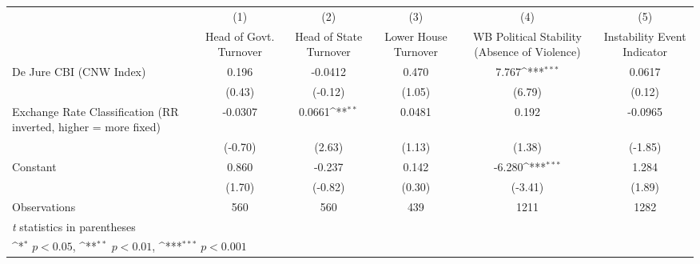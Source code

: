 {
\def\sym#1{\ifmmode^{#1}\else\(^{#1}\)\fi}
\begin{tabular}{l*{5}{c}}
\hline\hline
                &\multicolumn{1}{c}{(1)}&\multicolumn{1}{c}{(2)}&\multicolumn{1}{c}{(3)}&\multicolumn{1}{c}{(4)}&\multicolumn{1}{c}{(5)}\\
                &\multicolumn{1}{c}{Head of Govt. Turnover}&\multicolumn{1}{c}{Head of State Turnover}&\multicolumn{1}{c}{Lower House Turnover}&\multicolumn{1}{c}{WB Political Stability (Absence of Violence)}&\multicolumn{1}{c}{Instability Event Indicator}\\
\hline
De Jure CBI (CNW Index)&    0.196         &  -0.0412         &    0.470         &    7.767\sym{***}&   0.0617         \\
                &   (0.43)         &  (-0.12)         &   (1.05)         &   (6.79)         &   (0.12)         \\
[1em]
Exchange Rate Classification (RR inverted, higher = more fixed)&  -0.0307         &   0.0661\sym{**} &   0.0481         &    0.192         &  -0.0965         \\
                &  (-0.70)         &   (2.63)         &   (1.13)         &   (1.38)         &  (-1.85)         \\
[1em]
Constant        &    0.860         &   -0.237         &    0.142         &   -6.280\sym{***}&    1.284         \\
                &   (1.70)         &  (-0.82)         &   (0.30)         &  (-3.41)         &   (1.89)         \\
\hline
Observations    &      560         &      560         &      439         &     1211         &     1282         \\
\hline\hline
\multicolumn{6}{l}{\footnotesize \textit{t} statistics in parentheses}\\
\multicolumn{6}{l}{\footnotesize \sym{*} \(p<0.05\), \sym{**} \(p<0.01\), \sym{***} \(p<0.001\)}\\
\end{tabular}
}
